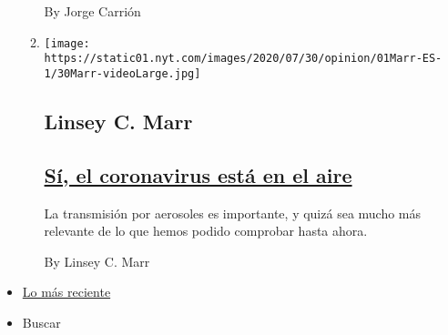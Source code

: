 \begin{enumerate}
\begin{enumerate}
    By Jorge Carrión
  \item
    \texttt{[image: https://static01.nyt.com/images/2020/07/30/opinion/01Marr-ES-1/30Marr-videoLarge.jpg]}

    \hypertarget{linsey-c-marr}{%
    \subsection{Linsey C. Marr}\label{linsey-c-marr}}

    \hypertarget{suxed-el-coronavirus-estuxe1-en-el-aire}{%
    \subsection{\texorpdfstring{\href{/es/2020/08/01/espanol/opinion/coronavirus-aire.html}{Sí,
    el coronavirus está en el
    aire}}{Sí, el coronavirus está en el aire}}\label{suxed-el-coronavirus-estuxe1-en-el-aire}}

    La transmisión por aerosoles es importante, y quizá sea mucho más
    relevante de lo que hemos podido comprobar hasta ahora.

    By Linsey C. Marr
  \end{enumerate}
\end{enumerate}

\begin{itemize}
\tightlist
\item
  \protect\hyperlink{stream-panel}{Lo más reciente}
\item
  Buscar
\end{itemize}

